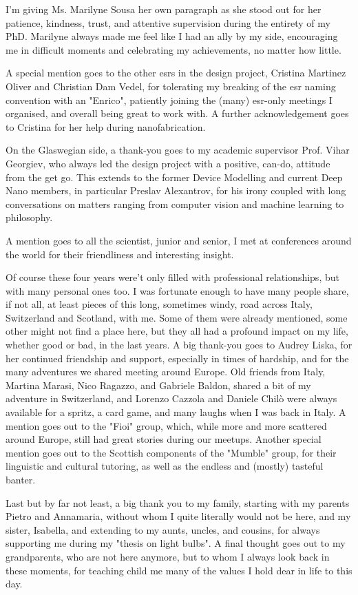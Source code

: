 I'm giving Ms. Marilyne Sousa her own paragraph as she stood out for her patience, kindness, trust, and attentive supervision during the entirety of my PhD. Marilyne always made me feel like I had an ally by my side, encouraging me in difficult moments and celebrating my achievements, no matter how little.

A special mention goes to the other \acs{esr}s in the \acs{design} project, Cristina Martinez Oliver and Christian Dam Vedel, for tolerating my breaking of the \acs{esr} naming convention with an "Enrico", patiently joining the (many) \acs{esr}-only meetings I organised, and overall being great to work with. A further acknowledgement goes to Cristina for her help during nanofabrication.

On the Glaswegian side, a thank-you goes to my academic supervisor Prof. Vihar Georgiev, who always led the \acs{design} project with a positive, can-do, attitude from the get go. This extends to the former Device Modelling and current Deep Nano members, in particular Preslav Alexantrov, for his irony coupled with long conversations on matters ranging from computer vision and machine learning to philosophy.

A mention goes to all the scientist, junior and senior, I met at conferences around the world for their friendliness and interesting insight.

Of course these four years were't only filled with professional relationships, but with many personal ones too. I was fortunate enough to have many people share, if not all, at least pieces of this long, sometimes windy, road across Italy, Switzerland and Scotland, with me. Some of them were already mentioned, some other might not find a place here, but they all had a profound impact on my life, whether good or bad, in the last years. A big thank-you goes to Audrey Liska, for her continued friendship and support, especially in times of hardship, and for the many adventures we shared meeting around Europe. Old friends from Italy, Martina Marasi, Nico Ragazzo, and Gabriele Baldon, shared a bit of my adventure in Switzerland, and Lorenzo Cazzola and Daniele Chilò were always available for a spritz, a card game, and many laughs when I was back in Italy. A mention goes out to the "Fioi" group, which, while more and more scattered around Europe, still had great stories during our meetups. Another special mention goes out to the Scottish components of the "Mumble" group, for their linguistic and cultural tutoring, as well as the endless and (mostly) tasteful banter.

Last but by far not least, a big thank you to my family, starting with my parents Pietro and Annamaria, without whom I quite literally would not be here, and my sister, Isabella, and extending to my aunts, uncles, and cousins, for always supporting me during my "thesis on light bulbs". A final thought goes out to my grandparents, who are not here anymore, but to whom I always look back in these moments, for teaching child me many of the values I hold dear in life to this day.